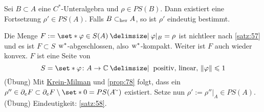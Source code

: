 \begin{korollar}[label=korr:714]
	Sei $B \subset A$ eine $C^*$-Unteralgebra und $\rho \in PS(B)$.
	Dann existiert eine Fortsetzung $\rho' \in PS(A)$.
	Falls $B\subset_{\operatorname{her}} A$, so ist $\rho'$ eindeutig bestimmt. 
\end{korollar}
\begin{beweis}
	Die Menge $F:= \set*{\varphi \in S(A) \given \varphi|_{B}=\rho}$ ist nichtleer nach \autoref{satz:57} und es ist $F \subset S$ $\mkern1mu\mathrm{w}^*$-abgeschlossen, also $\mkern1mu\mathrm{w}^*$-kompakt.
	Weiter ist $F$ auch wieder konvex.
	$F$ ist eine Seite von 
	\[
		S = \set*{\varphi \colon A \to \mathbb{C}\given \text{ positiv, linear, } \norm*{\varphi}\le 1} 
	\]
	(Übung)
	Mit \hyperref[satz:krein_milman]{Krein-Milman} und \autoref{prop:78} folgt, dass ein $\rho'' \in \partial_e F \subset\partial_e F \setminus\set*{0}=PS(A^\simm)$ existiert.
	Setze nun $\rho' := \rho''|_{A} \in PS(A)$.(Übung)
	Eindeutigkeit: \autoref{satz:58}.
\end{beweis}

